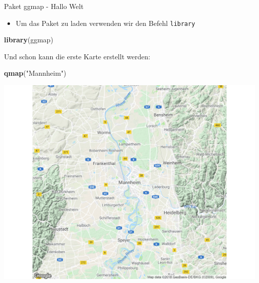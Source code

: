 \documentclass[ignorenonframetext,]{beamer}
\newenvironment{Shaded}{\begin{snugshade}}{\end{snugshade}}
\newcommand{\KeywordTok}[1]{\textcolor[rgb]{0.13,0.29,0.53}{\textbf{#1}}}
\newcommand{\StringTok}[1]{\textcolor[rgb]{0.31,0.60,0.02}{#1}}
\newcommand{\NormalTok}[1]{#1}
\providecommand{\tightlist}{%
  \setlength{\itemsep}{0pt}\setlength{\parskip}{0pt}}
\begin{document}
\begin{frame}[fragile]{Paket ggmap - Hallo Welt}

\begin{itemize}
\tightlist
\item
  Um das Paket zu laden verwenden wir den Befehl \texttt{library}
\end{itemize}

\begin{Shaded}
\begin{Highlighting}[]
\KeywordTok{library}\NormalTok{(ggmap)}
\end{Highlighting}
\end{Shaded}

Und schon kann die erste Karte erstellt werden:

\begin{Shaded}
\begin{Highlighting}[]
\KeywordTok{qmap}\NormalTok{(}\StringTok{"Mannheim"}\NormalTok{)}
\end{Highlighting}
\end{Shaded}

\includegraphics{figure/Mannheim_ggmap.pdf}

\end{frame}
\end{document}
